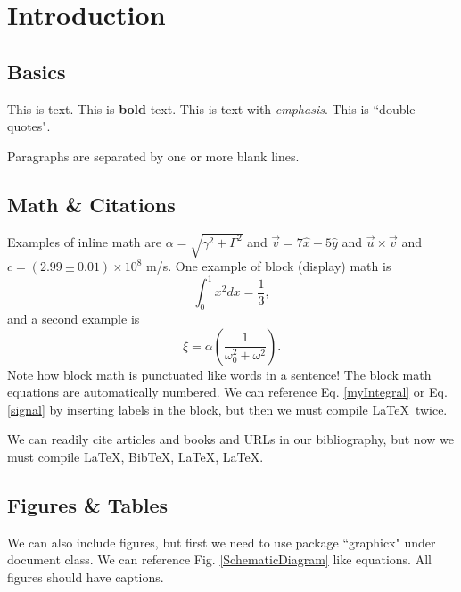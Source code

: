 \documentclass{book}
\begin{document}
\tableofcontents
\setcounter{tocdepth}{2}
\listoftables
\listoffigures

\mainmatter

\chapter{Introduction}\label{introduction}

\section{Basics}

This is text. This is \textbf{bold} text. This is text with \emph{emphasis}. This is ``double quotes". 

Paragraphs are separated by one or more blank lines. 

\section{Math \& Citations}	%
Examples of inline math are $\alpha = \sqrt{\gamma^2 + \Gamma^2}$ and $\vec{v} = 7 \hat{x} - 5 \hat{y}$ and $\vec u \times \vec v$ and $c = (2.99 \pm 0.01) \times 10^8$ m/s. One example of block (display) math is
%
\begin{equation}
	\int_0^1x^2 dx = \frac{1}{3},
	\label{myIntegral}
\end{equation}
%
and a second example is
%
\begin{equation}
	\xi = \alpha \left( \frac{1}{ \omega_0^2 + \omega^2 } \right).
	\label{signal}
\end{equation}
%
Note how block math is punctuated like words in a sentence! The block math equations are automatically numbered. We can reference Eq. \ref{myIntegral} or Eq. \ref{signal} by inserting labels in the block, but then we must compile \LaTeX\ twice.

We can readily cite articles \cite{Chenciner2000}  and books \cite{Gleick1987} and URLs \cite{Lindner2015} in our bibliography, but now we must compile \LaTeX, Bib\TeX,  \LaTeX, \LaTeX.

\section{Figures \& Tables}
We can also include figures, but first we need to use package ``graphicx" under document class. We can reference Fig. \ref{SchematicDiagram} like equations. All figures should have captions.
\end{document}
